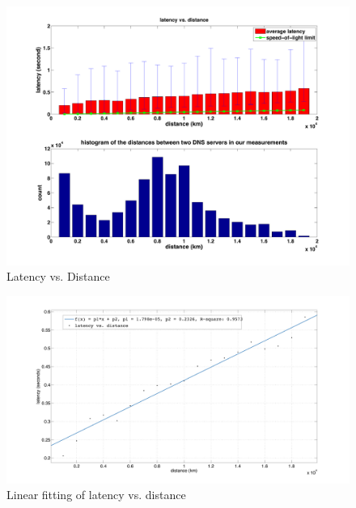 \begin{figure}
  \centering
  \includegraphics[width=0.9\linewidth]{../figs/King_latency_dist.pdf}
  \vspace{-0.5em}
  \caption{Latency vs. Distance}
  \label{fig:latency_dist}
\end{figure}

\begin{figure}
  \centering
  \includegraphics[width=\linewidth]{../figs/fit_curve.pdf}
  \vspace{-1em}
  \caption{Linear fitting of latency vs. distance}
  \label{fig:fit_curve}
\end{figure}


